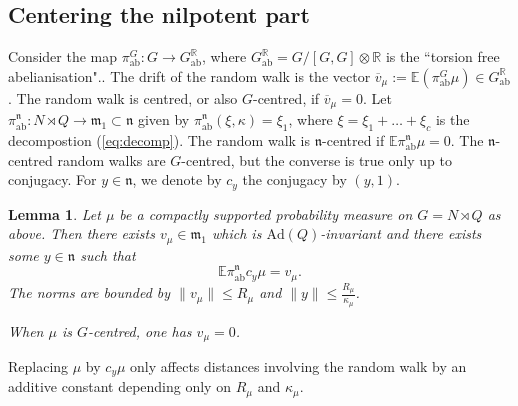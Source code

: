 \documentclass[11pt,leqno]{article}
\theoremstyle{plain}
\newtheorem{lemma}[theorem]{Lemma}
\theoremstyle{definition}
\theoremstyle{remark}
\numberwithin{equation}{section}
\newcommand{\R}{\mathbb{R}}
\newcommand{\Ad}{\mathrm{Ad}}
\begin{document}
 



\subsection{Centering the nilpotent part}

Consider the map $\pi_{\mathrm{ab}}^{G}: G \to G_{\mathrm{ab}}^\R$, where $G_{\mathrm{ab}}^\R=G/[G,G] \otimes \R$ is the ``torsion free abelianisation".. The drift of the random walk is the vector $\overline{v}_\mu:=\mathbb{E}(\pi_{\mathrm{ab}}^{G}\mu) \in G_{\mathrm{ab}}^\R$. The random walk is centred, or also $G$-centred, if $\overline{v}_\mu=0$.
Let $\pi_{\mathrm{ab}}^{\mathfrak{n}}: N \rtimes Q \to \mathfrak{m}_1 \subset \mathfrak{n}$ given by $\pi_{\mathrm{ab}}^{\mathfrak{n}}(\xi,\kappa)=\xi_1$, where $\xi=\xi_1+\dots+\xi_c$ is the decompostion (\ref{eq:decomp}). The random walk is $\mathfrak{n}$-centred if  $\mathbb{E}\pi_{\mathrm{ab}}^{\mathfrak{n}}\mu=0$. 
The $\mathfrak{n}$-centred random walks are $G$-centred, but the converse is true only up to conjugacy. For  $y \in \mathfrak{n}$, we denote by $c_y$ the conjugacy by $(y,1)$.



\begin{lemma}\label{lem:conjugate}
Let $\mu$ be a compactly supported probability measure on $G=N\rtimes Q$ as above. Then there exists $v_\mu \in \mathfrak{m}_1$ which is $\Ad(Q)$-invariant and there exists some $y \in \mathfrak{n}$ such that 
\[
\mathbb{E}\pi_{\mathrm{ab}}^{\mathfrak{n}}c_y\mu=v_\mu.
\]
The norms are bounded by $\|v_\mu\|\le R_\mu$ and  $\|y\|\le \frac{R_\mu}{\kappa_\mu}$.

When $\mu$ is $G$-centred, one has $v_\mu=0$.
\end{lemma}

Replacing $\mu$ by $c_y\mu$ only affects distances involving the random walk by an additive constant depending only on $R_\mu$ and $\kappa_\mu$. %
\end{document}
